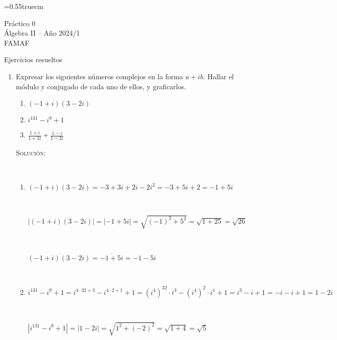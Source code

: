 \documentclass[a4paper,12pt,twoside,spanish,reqno]{amsbook}
\numberwithin{equation}{section}
\newcommand{\rta}{\noindent\textsc{Solución: }}
\begin{document}
    \baselineskip=0.55truecm %
    

    
    
    {\bf \begin{center}  Práctico 0 \\ Álgebra  II -- Año 2024/1 \\ FAMAF \end{center}}
    
    {\bf \begin{center} Ejercicios resueltos \end{center}}
    
    
    
    \begin{enumerate}
    \setlength\itemsep{1.1em}

\item Expresar los siguientes números complejos en la forma $a +i b$.
Hallar el módulo y conjugado de cada uno de ellos, y graficarlos.

\begin{multicols}{3}
\begin{enumerate}
\item $(-1+i) (3-2i)$
\item $i^{131} - i^9 +1$
\item $\frac {1+i}{1+2i} + \frac{1-i}{1-2i}$
\end{enumerate}
\end{multicols}

\rta

\

\begin{enumerate}
    \item $(-1+i) (3-2i) = -3 + 3i + 2i - 2i^2 = -3 + 5i + 2 = \boxed{-1 + 5i}$

\

$ | (-1+i) (3-2i) | = | -1 + 5i | = \sqrt{ (-1)^2 + 5^2 } = \sqrt{1 + 25 } = \boxed{\sqrt{ 26}}$

\

$ \overline{ (-1+i) (3-2i) } = \overline { -1 + 5i } = \boxed{ -1 -5i }$

\

\item $i^{131} - i^9 +1 = i^{4 \cdot 32 + 3} - i^{4 \cdot 2 + 1} +1 = 
(i^4)^{32} \cdot i^3 - (i^4)^2 \cdot i^1 + 1 = i^3 - i +1 = -i -i +1 = \boxed{ 1-2i}$

\

$ | i^{131} - i^9 +1 | = | 1-2i | = \sqrt{ 1^2 + (-2)^2 } = \sqrt{1 + 4 } = \boxed{\sqrt{ 5}}$


\end{enumerate}
\end{enumerate}
\end{document}

